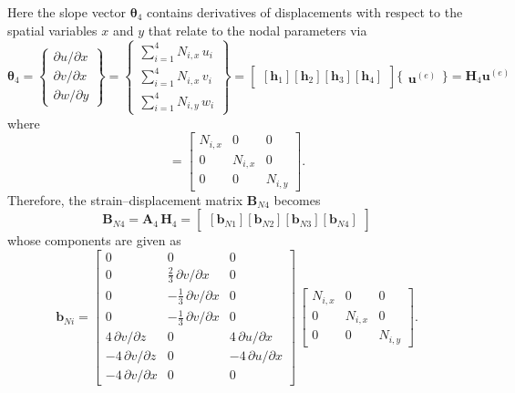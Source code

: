 Here the slope vector $\boldsymbol{\theta}_4$ contains derivatives of displacements with respect to the spatial variables $x$ and $y$ that relate to the nodal parameters via
\small
\begin{equation}
	\boldsymbol{\theta}_4 =  \begin{Bmatrix}
		\partial u / \partial x\\
		\partial v / \partial x \\
		\partial w / \partial y
	\end{Bmatrix}
	= \begin{Bmatrix}
		\sum\nolimits_{i=1}^4 N_{i,x} \, u_i\\
		\sum\nolimits_{i=1}^4 N_{i,x} \, v_i \\
		\sum\nolimits_{i=1}^4 N_{i,y} \, w_i
	\end{Bmatrix} 
	= \begin{bmatrix}
		[\mathbf{h}_1] [\mathbf{h}_2] [\mathbf{h}_3] [\mathbf{h}_4] 
	\end{bmatrix} \bigl\{ \begin{matrix} \mathbf{u}^{(e)} \end{matrix} \bigr\}
	= \mathbf{H}_4  \mathbf{u}^{(e)} 
\end{equation}
\normalsize
where 
\begin{equation}
	[\mathbf{h}_i] = \begin{bmatrix}
		N_{i,x} &  0 & 0  \\
		0 & N_{i,x} & 0  \\
		0 & 0 & N_{i,y} \end{bmatrix} . 
\end{equation}
Therefore, the strain--displacement matrix $\mathbf{B}_{N4}$ becomes
\begin{equation}
	\mathbf{B}_{N4} = \mathbf{A}_4 \, \mathbf{H}_4 = \begin{bmatrix}
		[\mathbf{b}_{N1}] [\mathbf{b}_{N2}] [\mathbf{b}_{N3}] [\mathbf{b}_{N4}]
	\end{bmatrix} 
\end{equation}
whose components are given as
\begin{equation}
	\mathbf{b}_{Ni} = \begin{bmatrix}
		0 & 0 &  0   \\
		0 &  \tfrac{2}{3} \, \partial v / \partial x & 0  \\
		0 &  - \tfrac{1}{3} \, \partial v / \partial x & 0 \\
		0 &  - \tfrac{1}{3} \, \partial v / \partial x & 0 \\
		4 \, \partial v / \partial z &  0 & 4 \, \partial u / \partial x  \\
		-4 \,\partial v / \partial z &  0 & -4 \,\partial u / \partial x  \\
		-4 \,\partial v / \partial x &  0 & 0  \end{bmatrix} \, \begin{bmatrix}
		N_{i,x} &  0 & 0  \\
		0 & N_{i,x} & 0  \\
		0 & 0 & N_{i,y}  \end{bmatrix}.
\end{equation}

